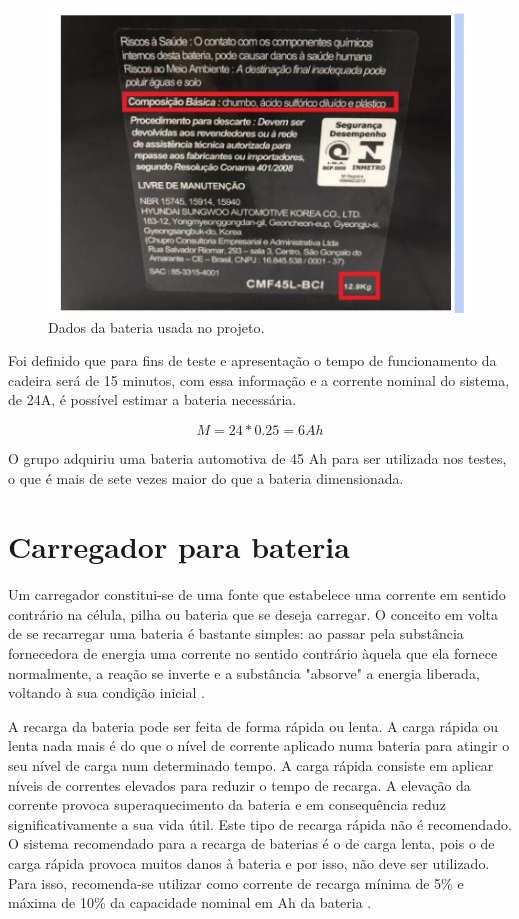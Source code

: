\begin{figure}[h!]
  \centering
  \includegraphics{figuras/Bateria2.jpg}
  \caption{Dados da bateria usada no projeto.}
\end{figure}

Foi definido que para fins de teste e apresentação o tempo de funcionamento da
cadeira será de 15 minutos, com essa informação e a corrente nominal do
sistema, de 24A, é possível estimar a bateria necessária. 

\[M = 24*0.25 = 6 Ah\]

O grupo adquiriu uma bateria automotiva de 45 Ah para ser utilizada nos testes,
o que é mais de sete vezes maior do que a bateria dimensionada.

\section{Carregador para bateria}

 Um carregador constitui-se de uma fonte que estabelece uma corrente em sentido
 contrário na célula, pilha ou bateria que se deseja carregar. O conceito em
 volta de se recarregar uma bateria é bastante simples: ao passar pela
 substância fornecedora de energia uma corrente no sentido contrário àquela que
 ela fornece normalmente, a reação se inverte e a substância "absorve" a
 energia liberada, voltando à sua condição inicial \cite{bahiadesenvolvimento}.

A recarga da bateria pode ser feita de forma rápida ou lenta. A carga rápida ou
lenta nada mais é do que o nível de corrente aplicado numa bateria para atingir
o seu nível de carga num determinado tempo. A carga rápida consiste em aplicar
níveis de correntes elevados para reduzir o tempo de recarga. A elevação da
corrente provoca superaquecimento da bateria e em consequência reduz
significativamente a sua vida útil. Este tipo de recarga rápida não é
recomendado. O sistema recomendado para a recarga de baterias é o de carga
lenta, pois o de carga rápida provoca muitos danos à bateria e por isso, não
deve ser utilizado. Para isso, recomenda-se utilizar como corrente de recarga
mínima de 5\% e máxima de 10\% da capacidade nominal em Ah da bateria
\cite{soares2012sistema}.

